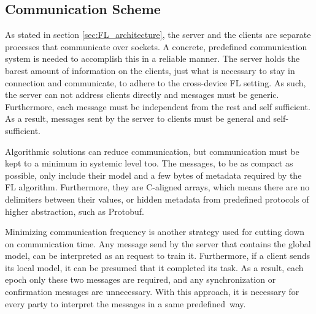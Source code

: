 \subsection{Communication Scheme}
As stated in section \ref{sec:FL_architecture}, the server and the clients are separate processes that communicate over sockets. A concrete, predefined communication system is needed to accomplish this in a reliable manner. The server holds the barest amount of information on the clients, just what is necessary to stay in connection and communicate, to adhere to the cross-device FL setting.
As such, the server can not address clients directly and messages must be generic. Furthermore, each message must be independent from the rest and self sufficient. As a result, messages sent by the server to clients must be general and self-sufficient.

Algorithmic solutions can reduce communication, but communication must be kept to a minimum in systemic level too. The messages, to be as compact as possible, only include their model and a few bytes of metadata required by the FL algorithm. Furthermore, they are C-aligned arrays, which means there are no delimiters between their values, or hidden metadata from predefined protocols of higher abstraction, such as Protobuf.

Minimizing communication frequency is another strategy used for cutting down on communication time. Any message send by the server that contains the global model, can be interpreted as an request to train it. Furthermore, if a client sends its local model, it can be presumed that it completed its task. As a result, each epoch only these two messages are required, and any synchronization or confirmation messages are unnecessary. With this approach, it is necessary for every party to interpret the messages in a same predefined way.

